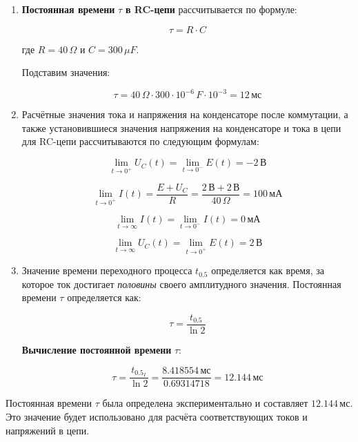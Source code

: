 \begin{enumerate}
	\item \textbf{Постоянная времени } $\tau$ \textbf{в RC-цепи} рассчитывается по формуле:

	      \[
		      \tau = R \cdot C
	      \]

	      где $R = 40 \, \Omega$ и $C = 300 \, \mu F$.

	      Подставим значения:

	      \[
		      \tau = 40 \, \Omega \cdot 300 \cdot 10^{-6} \, F \cdot 10^{-3} = 12 \, \text{мс}
	      \]

	\item Расчётные значения тока и напряжения на конденсаторе после коммутации, а также установившиеся значения напряжения на конденсаторе и тока в цепи для RC-цепи рассчитываются по следующим формулам:

	      \[
		      \lim_{t \to 0^+} U_C(t) = \lim_{t \to 0^-} E(t) = -2 \, \text{В}
	      \]

	      \[
		      \lim_{t \to 0^+} I(t) = \frac{E + U_C}{R} = \frac{2\, \text{В} + 2\, \text{В}}{40 \, \Omega} = 100 \, \text{мА}
	      \]

	      \[
		      \lim_{t \to \infty} I(t) = \lim_{t \to 0^-} I(t) = 0 \, \text{мА}
	      \]

	      \[
		      \lim_{t \to \infty} U_C(t) = \lim_{t \to 0^+} E(t) = 2 \, \text{В}
	      \]

	\item Значение времени переходного процесса \( t_{0.5} \) определяется как время, за которое ток достигает \textit{половины} своего амплитудного значения. Постоянная времени \( \tau \) определяется как:

	      \[
		      \tau = \frac{t_{0.5}}{\ln 2}
	      \]

	      \textbf{Вычисление постоянной времени } \( \tau \):

	      \[
		      \tau = \frac{t_{0.5_I}}{\ln 2} = \frac{8.418554 \, \text{мс}}{0.69314718} = 12.144 \, \text{мс}
	      \]

\end{enumerate}

Постоянная времени \( \tau \) была определена экспериментально и составляет \( 12.144 \, \text{мс} \). Это значение будет использовано для расчёта соответствующих токов и напряжений в цепи.
